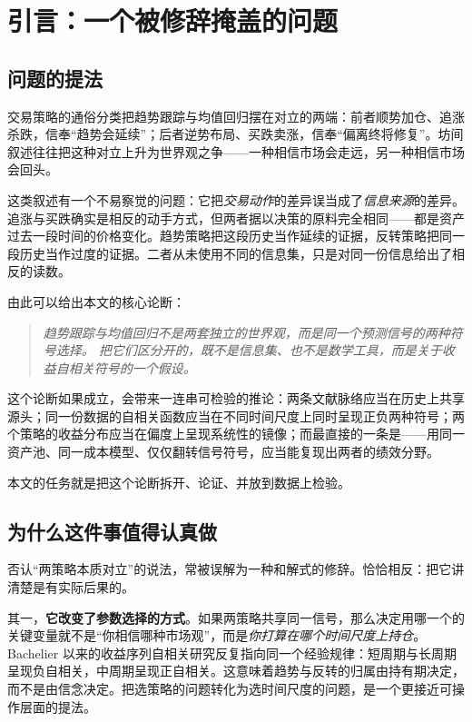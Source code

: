 \section{引言：一个被修辞掩盖的问题}\label{sec:intro}

\subsection{问题的提法}

交易策略的通俗分类把趋势跟踪与均值回归摆在对立的两端：前者顺势加仓、追涨杀跌，信奉“趋势会延续”；后者逆势布局、买跌卖涨，信奉“偏离终将修复”。坊间叙述往往把这种对立上升为世界观之争——一种相信市场会走远，另一种相信市场会回头。

这类叙述有一个不易察觉的问题：它把\emph{交易动作}的差异误当成了\emph{信息来源}的差异。追涨与买跌确实是相反的动手方式，但两者据以决策的原料完全相同——都是资产过去一段时间的价格变化。趋势策略把这段历史当作延续的证据，反转策略把同一段历史当作过度的证据。二者从未使用不同的信息集，只是对同一份信息给出了相反的读数。

由此可以给出本文的核心论断：

\begin{quote}
\itshape
趋势跟踪与均值回归不是两套独立的世界观，而是同一个预测信号的两种符号选择。
把它们区分开的，既不是信息集、也不是数学工具，而是关于\emph{收益自相关符号}的一个假设。
\end{quote}

这个论断如果成立，会带来一连串可检验的推论：两条文献脉络应当在历史上共享源头；同一份数据的自相关函数应当在不同时间尺度上同时呈现正负两种符号；两个策略的收益分布应当在偏度上呈现系统性的镜像；而最直接的一条是——用同一资产池、同一成本模型、仅仅翻转信号符号，应当能复现出两者的绩效分野。

本文的任务就是把这个论断拆开、论证、并放到数据上检验。

\subsection{为什么这件事值得认真做}

否认“两策略本质对立”的说法，常被误解为一种和解式的修辞。恰恰相反：把它讲清楚是有实际后果的。

其一，\textbf{它改变了参数选择的方式}。如果两策略共享同一信号，那么决定用哪一个的关键变量就不是“你相信哪种市场观”，而是\emph{你打算在哪个时间尺度上持仓}。Bachelier 以来的收益序列自相关研究反复指向同一个经验规律：短周期与长周期呈现负自相关，中周期呈现正自相关。这意味着趋势与反转的归属由持有期决定，而不是由信念决定。把选策略的问题转化为选时间尺度的问题，是一个更接近可操作层面的提法。

